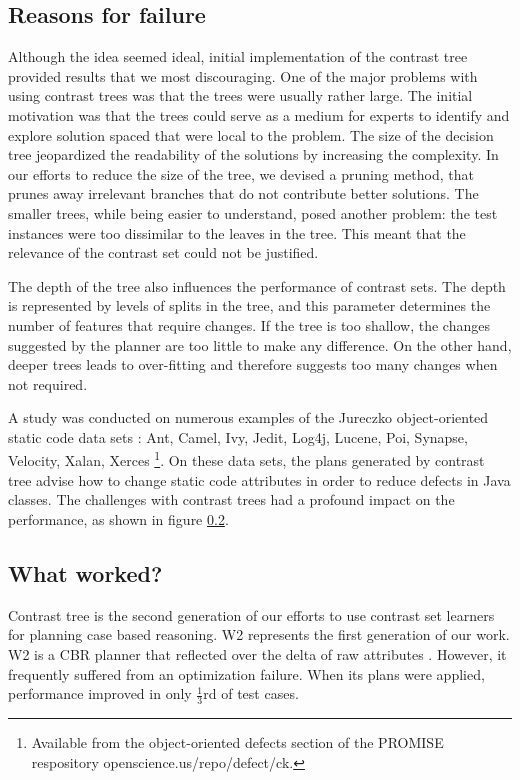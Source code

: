 \documentclass[conference]{IEEEtran}
\begin{document}
\subsection{Reasons for failure}
Although the idea seemed ideal, initial implementation of the contrast tree provided results that we most discouraging. One of the major problems with using contrast trees was that the trees were usually rather large. The initial motivation was that the trees could serve as a medium for experts to identify and explore solution spaced that were local to the problem. The size of the decision tree jeopardized the readability of the solutions by increasing the complexity. In our efforts to reduce the size of the tree, we devised a pruning method, that prunes away irrelevant branches that do not contribute better solutions. The smaller trees, while being easier to understand, posed another problem: the test instances were too dissimilar to the leaves in the tree. This meant that the relevance of the contrast set could not be justified.

The depth of the tree also influences the performance of contrast sets. The depth is represented by levels of splits in the tree, and this parameter determines the number of features that require changes. If the tree is too shallow, the changes suggested by the planner are too little to make any difference. On the other hand, deeper trees leads to over-fitting and therefore suggests too many changes when not required.

A study was conducted on numerous examples of the Jureczko object-oriented static code data sets \cite{}: Ant, Camel, Ivy, Jedit, Log4j, Lucene, Poi, Synapse, Velocity, Xalan, Xerces \footnote{Available from the object-oriented defects section of the PROMISE respository openscience.us/repo/defect/ck.}. On these data sets, the plans generated by contrast tree advise
how to change static code attributes in order to reduce defects in Java classes. The challenges with contrast trees had a profound impact on the performance, as shown in figure \ref{}.
\subsection{What worked?}
Contrast tree is the second generation of our efforts to use contrast set learners for planning case based reasoning. W2 represents the first generation of our work. W2 is a CBR planner that reflected over the delta of raw attributes \cite{}. However, it frequently suffered from an optimization failure. When its plans were applied, performance improved in only  $\tfrac{1}{3}$rd of test cases. 
\end{document}
